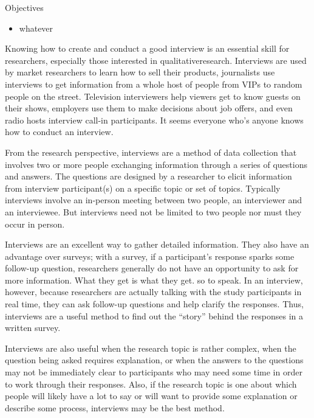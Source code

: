\begin{center}
	\begin{objbox}{Objectives}
		\begin{itemize}
			\setlength{\itemsep}{0pt}
			\setlength{\parskip}{0pt}
			\setlength{\parsep}{0pt}
			
			\item whatever

		\end{itemize}
	\end{objbox}
\end{center}

Knowing how to create and conduct a good interview is an essential skill for researchers, especially those interested in \gls{qualitativeresearch}. Interviews are used by market researchers to learn how to sell their products, journalists use interviews to get information from a whole host of people from VIPs to random people on the street. Television interviewers help viewers get to know guests on their shows, employers use them to make decisions about job offers, and even radio hosts interview call-in participants. It seems everyone who's anyone knows how to conduct an interview.

From the research perspective, interviews are a method of data collection that involves two or more people exchanging information through a series of questions and answers. The questions are designed by a researcher to elicit information from interview participant(s) on a specific topic or set of topics. Typically interviews involve an in-person meeting between two people, an interviewer and an interviewee. But interviews need not be limited to two people nor must they occur in person.

Interviews are an excellent way to gather detailed information. They also have an advantage over surveys; with a survey, if a participant's response sparks some follow-up question, researchers generally do not have an opportunity to ask for more information. What they get is what they get. so to speak. In an interview, however, because researchers are actually talking with the study participants in real time, they can ask follow-up questions and help clarify the responses. Thus, interviews are a useful method to find out the ``story'' behind the responses in a written survey.

Interviews are also useful when the research topic is rather complex, when the question being asked requires explanation, or when the answers to the questions may not be immediately clear to participants who may need some time in order to work through their responses. Also, if the research topic is one about which people will likely have a lot to say or will want to provide some explanation or describe some process, interviews may be the best method. 

